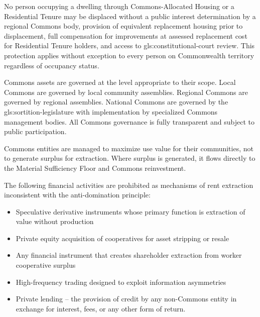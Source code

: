 No person occupying a dwelling through Commons-Allocated Housing or a Residential Tenure may be displaced without a public interest determination by a regional Commons body, provision of equivalent replacement housing prior to displacement, full compensation for improvements at assessed replacement cost for Residential Tenure holders, and access to \gls{gls:constitutional-court} review. This protection applies without exception to every person on Commonwealth territory regardless of occupancy status.

Commons assets are governed at the level appropriate to their scope. Local Commons are governed by local community assemblies. Regional Commons are governed by regional assemblies. National Commons are governed by the \gls{gls:sortition-legislature} with implementation by specialized Commons management bodies. All Commons governance is fully transparent and subject to public participation.

Commons entities are managed to maximize use value for their communities, not to generate surplus for extraction. Where surplus is generated, it flows directly to the Material Sufficiency Floor and Commons reinvestment.


The following financial activities are prohibited as mechanisms of rent extraction inconsistent with the anti-domination principle:
\begin{itemize}
  \item Speculative derivative instruments whose primary function is extraction of value without production
  \item Private equity acquisition of cooperatives for asset stripping or resale
  \item Any financial instrument that creates shareholder extraction from worker cooperative surplus
  \item High-frequency trading designed to exploit information asymmetries
  \item Private lending -- the provision of credit by any non-Commons entity in exchange for interest, fees, or any other form of return.
\end{itemize}

